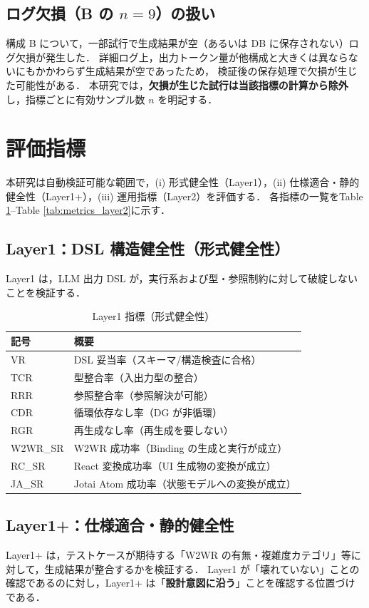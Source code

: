 \documentclass[senior,final,11pt,dvipdfmx]{iputit-thesis}
\begin{document}
\subsection{ログ欠損（B の $n=9$）の扱い}
構成 B について，一部試行で生成結果が空（あるいは DB に保存されない）ログ欠損が発生した．
詳細ログ上，出力トークン量が他構成と大きくは異ならないにもかかわらず生成結果が空であったため，
検証後の保存処理で欠損が生じた可能性がある．
本研究では，\textbf{欠損が生じた試行は当該指標の計算から除外}し，指標ごとに有効サンプル数 $n$ を明記する．

\section{評価指標}
本研究は自動検証可能な範囲で，(i) 形式健全性（Layer1），(ii) 仕様適合・静的健全性（Layer1+），(iii) 運用指標（Layer2）を評価する．
各指標の一覧をTable \ref{tab:metrics_layer1}--Table \ref{tab:metrics_layer2}に示す．

\subsection{Layer1：DSL 構造健全性（形式健全性）}
Layer1 は，LLM 出力 DSL が，実行系および型・参照制約に対して破綻しないことを検証する．

\begin{table}[!t]
\centering
\caption{Layer1 指標（形式健全性）}
\label{tab:metrics_layer1}
\small
\begin{tabular}{ll} \toprule
記号 & 概要 \\ \midrule
VR & DSL 妥当率（スキーマ/構造検査に合格）\\
TCR & 型整合率（入出力型の整合）\\
RRR & 参照整合率（参照解決が可能）\\
CDR & 循環依存なし率（DG が非循環）\\
RGR & 再生成なし率（再生成を要しない）\\
W2WR\_SR & W2WR 成功率（Binding の生成と実行が成立）\\
RC\_SR & React 変換成功率（UI 生成物の変換が成立）\\
JA\_SR & Jotai Atom 成功率（状態モデルへの変換が成立）\\
\bottomrule
\end{tabular}
\end{table}

\subsection{Layer1+：仕様適合・静的健全性}
Layer1+ は，テストケースが期待する「W2WR の有無・複雑度カテゴリ」等に対して，生成結果が整合するかを検証する．
Layer1 が「壊れていない」ことの確認であるのに対し，Layer1+ は「\textbf{設計意図に沿う}」ことを確認する位置づけである．
\end{document}
